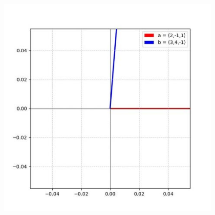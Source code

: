 \documentclass[journal]{IEEEtran}
\begin{document}
\begin{figure}[h]
    \centering
    \includegraphics[scale=0.5]{figs/2.2.6.jpg}
    \caption{}
    \label{fig:1}
\end{figure}
\end{document}
